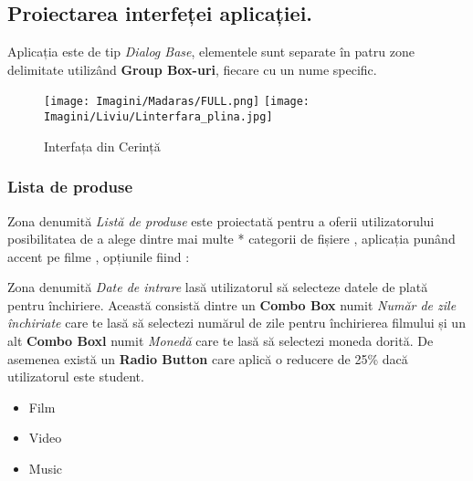 \documentclass{amsart}
\begin{document}
\subsection{Proiectarea interfeței aplicației.}
\hfill \newline
Aplicația este de tip \textit{Dialog Base}, elementele sunt separate în patru zone delimitate utilizând \textbf{Group Box-uri}, fiecare cu un nume specific. \:


\begin{figure}[h]
    \centering
    \texttt{[image: Imagini/Madaras/FULL.png]}
    \texttt{[image: Imagini/Liviu/Linterfara\_plina.jpg]}
    \caption{Interfața din Cerință}
    \label{fig:mesh1}
\end{figure}




\subsubsection{\textbf{Lista de produse}}\hfill
\newline 
Zona denumită \textit{Listă de produse} este proiectată pentru a oferii utilizatorului posibilitatea de a alege dintre mai multe * { categorii de fișiere , aplicația punând accent pe filme , opțiunile fiind : }

%

Zona denumită \textit{Date de intrare} lasă utilizatorul să selecteze datele de plată pentru închiriere. Această consistă dintre un \textbf{Combo Box}  numit \textit{Număr de zile închiriate} care te lasă să selectezi numărul de zile pentru închirierea filmului și un alt \textbf{Combo Boxl} numit \textit{Monedă} care te lasă să selectezi moneda dorită. De asemenea există un \textbf{Radio Button} care aplică o reducere de 25\% dacă utilizatorul este student.





\begin{itemize}
\item Film
\item Video
\item Music
\end{itemize}
    
\end{document}
